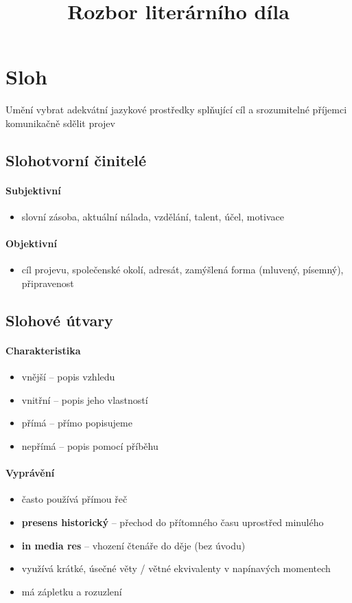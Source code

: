 \title{Rozbor literárního díla}


\section{Sloh}
Umění vybrat adekvátní jazykové prostředky splňující cíl a srozumitelné příjemci komunikačně sdělit projev

\subsection{Slohotvorní činitelé}
\paragraph{Subjektivní}
\begin{itemize}
\item slovní zásoba, aktuální nálada, vzdělání, talent, účel, motivace
\end{itemize}

\paragraph{Objektivní}
\begin{itemize}
\item cíl projevu, společenské okolí, adresát, zamýšlená forma (mluvený, písemný), připravenost
\end{itemize}


\subsection{Slohové útvary}
\paragraph{Charakteristika}
\begin{itemize}
\item vnější -- popis vzhledu
\item vnitřní -- popis jeho vlastností
\item přímá -- přímo popisujeme
\item nepřímá -- popis pomocí příběhu
\end{itemize}

\paragraph{Vyprávění}
\begin{itemize}
\item často používá přímou řeč
\item \textbf{presens historický} -- přechod do přítomného času uprostřed minulého
\item \textbf{in media res} -- vhození čtenáře do děje (bez úvodu)
\item využívá krátké, úsečné věty / větné ekvivalenty v napínavých momentech
\item má zápletku a rozuzlení
\end{itemize}

